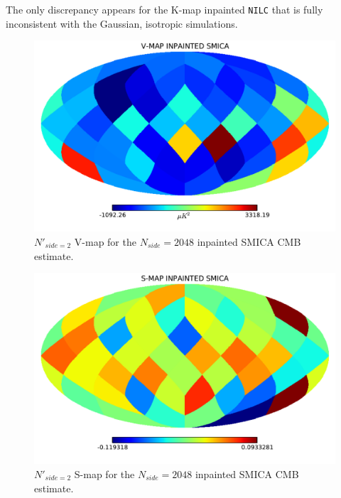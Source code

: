 The only discrepancy appears for the K-map inpainted \texttt{NILC} that is fully inconsistent with the Gaussian, isotropic simulations. 

\begin{figure}
\centering
\includegraphics[width=\textwidth]{figures/chapter-vsk/vmap-inpainted-smica.pdf}
\caption{$N'_{side = 2}$ V-map for the $N_{side} = 2048$ inpainted SMICA CMB estimate.}
\label{Fig:0a}
\end{figure}

\begin{figure}
\centering
\includegraphics[width=\textwidth]{figures/chapter-vsk/smap-inpainted-smica.pdf}
\caption{$N'_{side = 2}$ S-map for the $N_{side} = 2048$ inpainted SMICA CMB estimate.}
\label{Fig:0b}
\end{figure}

